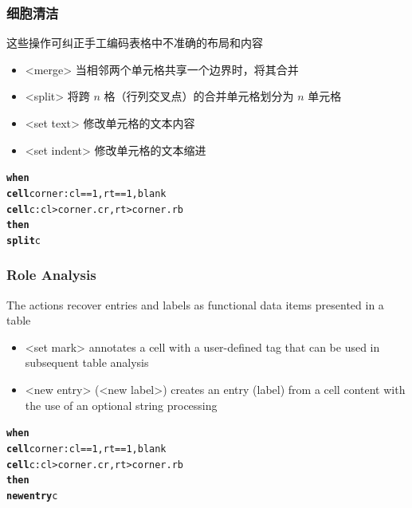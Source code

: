 \documentclass[10pt]{beamer}
\begin{document}
\begin{frame}[fragile]
\frametitle{细胞清洁}
这些操作可纠正手工编码表格中不准确的布局和内容
\begin{itemize}
	\item \alert{<merge>} 当相邻两个单元格共享一个边界时，将其合并
	\item \alert{<split>} 将跨 $n$ 格（行列交叉点）的合并单元格划分为 $n$ 单元格
	\item \alert{<set text>} 修改单元格的文本内容
	\item \alert{<set indent>} 修改单元格的文本缩进
\end{itemize}
\footnotesize{
\begin{example}
\begin{alltt}
\textbf{when}
  \textbf{cell} corner: cl == 1, rt == 1, blank
  \textbf{cell} c: cl > corner.cr, rt > corner.rb
\textbf{then}
  \textbf{split} c
\end{alltt}
\end{example}
}
\end{frame}


\begin{frame}[fragile]
\frametitle{Role Analysis}
The actions recover entries and labels as functional data items presented in a table
\begin{itemize}
	\item \alert{<set mark>} annotates a cell with a user-defined tag that can be used in subsequent table analysis
	\item \alert{<new entry>} (\alert{<new label>}) creates an entry (label) from a cell content with the use of an optional string processing
\end{itemize}
\footnotesize{
\begin{example}
\begin{alltt}
\textbf{when}
  \textbf{cell} corner: cl == 1, rt == 1, blank
  \textbf{cell} c: cl > corner.cr, rt > corner.rb
\textbf{then}
  \textbf{new entry} c
\end{alltt}
\end{example}
}
\end{frame}
\end{document}
